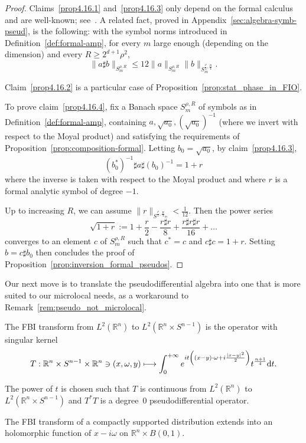 \documentclass[AHL,Unicode,longabstracts,published]{cedram}
\newcommand\1{\mathds{1}}
\newcommand{\R}{\mathbb{R}}
\newcommand{\dd}{\mathrm{d}}
\let\oldmapsto\mapsto
\renewcommand*{\mapsto}{\mathchoice{\longmapsto}{\oldmapsto}{\oldmapsto}{\oldmapsto}}
\let\originalleft\left
\let\originalright\right
\renewcommand{\left}{\mathopen{}\mathclose\bgroup\originalleft}
\renewcommand{\right}{\aftergroup\egroup\originalright}
\begin{document}
\begin{proof}
Claims~\eqref{prop4.16.1} and~\eqref{prop4.16.3} only depend on the formal calculus and are well-known; see~\cite{sjostrand_singularites_1982}. A related fact, proved in Appendix~\ref{sec:algebra-symb-pseud}, is the following: with the symbol norms introduced in Definition~\ref{def:formal-amp}, for every $m$ large enough (depending on the dimension) and every $R\geq 2^{d+1}\rho^2$,
\[
\|a\sharp b\|_{S_m^{\rho,R}}\leq 12\|a\|_{S_m^{\rho,R}}\|b\|_{S_m^{\frac{\rho}{2},\frac{R}{4}}}.
\]

Claim~\eqref{prop4.16.2} is a particular case of Proposition~\ref{prop:stat_phase_in_FIO}.

To prove claim~\eqref{prop4.16.4}, fix a Banach space $S^{\rho,R}_m$ of symbols as in Definition~\ref{def:formal-amp}, containing $a,\sqrt{a_0},(\sqrt{a_0})^{-1}$ (where we invert with respect to the Moyal product) and satisfying the requirements of Proposition~\ref{prop:composition-formal}. Letting $b_0=\sqrt{a_0}$, by claim~\eqref{prop4.16.3},
\[
(b_0^*)^{-1}\sharp a\sharp (b_0)^{-1}=1+r
\]
where the inverse is taken with respect to the Moyal product and where $r$ is a formal analytic symbol of degree $-1$.

Up to increasing $R$, we can assume $\|r\|_{S^{\frac{\rho}{2},\frac{R}{4}_m}}<\frac{1}{12}$. Then the power series
\[
\sqrt{1+r}:=1+\frac{r}{2}-\frac{r\sharp r}{8}+\frac{r\sharp r
\sharp r}{16}+\dots
\]
converges to an element $c$ of $S^{\rho,R}_m$ such that $c^*=c$ and $c\sharp c = 1+r$. Setting $b=c\sharp b_0$ then concludes the proof of Proposition~\ref{prop:inversion_formal_pseudos}.
\end{proof}

Our next move is to translate the pseudodifferential algebra into one that is more suited to our microlocal needs, as a workaround to Remark~\ref{rem:pseudo_not_microlocal}.

\begin{defi}\label{def:FBI}
The FBI transform from $L^2(\R^n)$ to $L^2(\R^n\times S^{n-1})$ is the operator with singular kernel
\[
T:\R^n\times S^{n-1}\times \R^n\ni (x,\omega,y)\mapsto \int_0^{+\infty} e^{it\left((x-y)\cdot
\omega+i\frac{|x-y|^2}{2}\right)}t^{\frac{n+1}{4}}\dd t.
\]
\end{defi} The power of $t$ is chosen such that $T$ is continuous from $L^2(\R^n)$ to $L^2(\R^n\times S^{n-1})$ and $T^*T$ is a degree~$0$ pseudodifferential operator.

\begin{prop}\label{prop:FBI_holom_ext}
The FBI transform of a compactly supported distribution extends into an holomorphic function of $x-i\omega$ on $\R^n\times B(0,1)$.
\end{prop}
\end{document}
